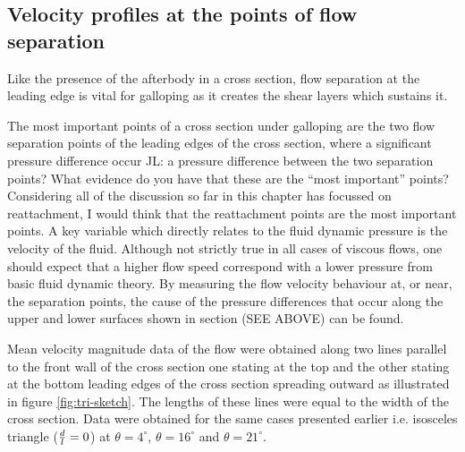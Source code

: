 



\subsection{Velocity profiles at the points of flow separation}

Like the presence of the afterbody in a cross section, flow separation at the leading edge is vital for galloping as it creates the shear layers which sustains it.  




The most important points of a cross section under galloping are the two flow separation points of the leading edges of the cross section, where a significant pressure difference occur JL: a pressure difference between the two separation points? What evidence do you have that these are the ``most important'' points? Considering all of the discussion so far in this chapter has focussed on reattachment, I would think that the reattachment points are the most important points. A key variable which directly relates to the fluid dynamic pressure is the velocity of the fluid. Although not strictly true in all cases of viscous flows, one should expect that a higher flow speed correspond with a lower pressure from basic fluid dynamic theory. By measuring the flow velocity behaviour at, or near, the separation points, the cause of the pressure differences that occur along the upper and lower surfaces shown in section (SEE ABOVE) can be found.


   
Mean velocity magnitude data of the flow were obtained along two lines parallel to the front wall of the cross section one stating at the top and the other stating at the bottom leading edges of the cross section spreading outward as illustrated in figure \ref{fig:tri-sketch}. The lengths of these lines were equal to the width of the cross section. Data were obtained for the same cases presented earlier i.e. isosceles triangle ($\frac{d}{l}=0$) at $\theta=4^{\circ}$, $\theta=16^{\circ}$ and $\theta=21^{\circ}$.
       
